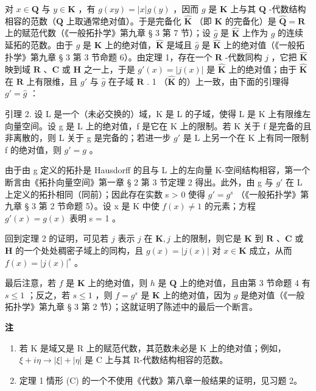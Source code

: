对 \(x \in \mathbf{Q}\) 与 \(y \in \mathbf{K}\) ，有 \(g(xy) = |x|g(y)\) ，因而 \(g\) 是 \(\mathbf{K}\) 上与其 \(\mathbf{Q}\) -代数结构相容的范数（\(\mathbf{Q}\) 上取通常绝对值）。于是完备化 \(\hat{\mathbf{K}}\) （即 \(\mathbf{K}\) 的完备化）是 \(\hat{\mathbf{Q}} = \mathbf{R}\) 上的赋范代数（《一般拓扑学》第九章 § 3 第 7 节）；设 \(\hat{g}\) 是 \(\hat{\mathbf{K}}\) 上作为 \(g\) 的连续延拓的范数。由于 \(g\) 是 \(\mathbf{K}\) 上的绝对值，\(\hat{\mathbf{K}}\) 是域且 \(\hat{g}\) 是 \(\hat{\mathbf{K}}\) 上的绝对值（《一般拓扑学》第九章 § 3 第 3 节命题 6）。由定理 1，存在一个 \(\mathbf{R}\) -代数同构 \(j\) ，它把 \(\hat{\mathbf{K}}\) 映到域 \(\mathbf{R}\) 、\(\mathbf{C}\) 或 \(\mathbf{H}\) 之一上，于是 \(g'(x) = |j(x)|\) 是 \(\hat{\mathbf{K}}\) 上的绝对值；由于 \(\hat{\mathbf{K}}\) 在 \(\mathbf{R}\) 上有限维，且 \(g'\) 与 \(\hat{g}\) 在子域 \(\mathbf{R}\) . 1 （\(\hat{\mathbf{K}}\) 的）上一致，由下面的引理得 \(g' = \hat{g}\) ：

引理 2. 设 L 是一个（未必交换的）域，K 是 L 的子域，使得 L 是 K 上有限维左向量空间。设 g 是 L 上的绝对值，f 是它在 K 上的限制。若 K 关于 f 是完备的且非离散的，则 L 关于 g 是完备的；若进一步 \(g'\) 是 L 上另一个在 K 上有同一限制 f 的绝对值，则 \(g' = g\) 。

由于由 g 定义的拓扑是 Hausdorff 的且与 L 上的左向量 K-空间结构相容，第一个断言由《拓扑向量空间》第一章 § 2 第 3 节定理 2 得出。此外，由 g 与 \(g'\) 在 L 上定义的拓扑相同（同前）；因此存在实数 s > 0 使得 \(g' = g^{s}\) （《一般拓扑学》第九章 § 3 第 2 节命题 5）。设 x 是 K 中使 \(f(x) \neq 1\) 的元素；方程 \(g'(x) = g(x)\) 表明 s = 1 。

回到定理 2 的证明，可见若 \(j\) 表示 \(\hat{j}\) 在 \(\mathbf{K}, j\) 上的限制，则它是 \(\mathbf{K}\) 到 \(\mathbf{R}\) 、\(\mathbf{C}\) 或 \(\mathbf{H}\) 的一个处处稠密子域上的同构，且 \(g(x) = |j(x)|\) 对 \(x \in \mathbf{K}\) 成立，从而 \(f(x) = |j(x)|^s\) 。

最后注意，若 \(f\) 是 \(\mathbf{K}\) 上的绝对值，则 \(h\) 是 \(\mathbf{Q}\) 上的绝对值，且由第 3 节命题 4 有 \(s \leqslant 1\) ；反之，若 \(s \leqslant 1\) ，则 \(f = g^s\) 是 \(\mathbf{K}\) 上的绝对值，因为 \(g\) 是绝对值（《一般拓扑学》第九章 § 3 第 2 节）；这就证明了陈述中的最后一个断言。

\textbf{注}\par

\begin{enumerate}
\def\labelenumi{(\arabic{enumi})}
\setcounter{enumi}{1}
\item
  若 K 是域又是 R 上的赋范代数，其范数未必是 K 上的绝对值；例如，\(\xi + i\eta \to |\xi| + |\eta|\) 是 C 上与其 R-代数结构相容的范数。
\item
  定理 1 情形 (C) 的一个不使用《代数》第八章一般结果的证明，见习题 2。
\end{enumerate}


